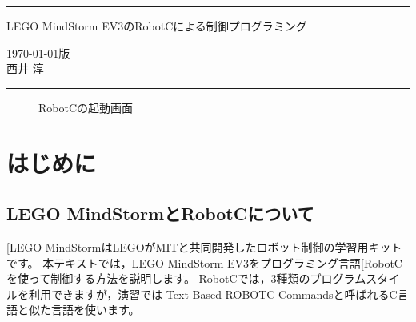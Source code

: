 \documentclass[11pt]{jsarticle}
\makeatletter
\def\nmindex{\@ifnextchar[{\@nmindex}{\@@nmindex}}
\def\@nmindex[#1]#2{#2\index{#1@#2}}
\def\@@nmindex#1{#1\index{#1}}
\makeatother
\begin{document}
\pagestyle{empty}
\vspace{-0.6cm}
\noindent
\rule{\linewidth}{0.5pt}
\begin{center}
{\Large LEGO MindStorm EV3のRobotCによる制御プログラミング}
\end{center}
\begin{flushright}
\today 版\\
西井 淳
\end{flushright}
\vspace{-0.6cm}
\rule{\linewidth}{0.5pt}

\vspace{-0.6cm}
{\small
  \setcounter{tocdepth}{3}
  \tableofcontents
}

\newpage
\pagestyle{fancy}


\begin{figure}\vspace{-.5cm}
  \caption{\label{fig:start}RobotCの起動画面}
\end{figure}
\section{はじめに}

\subsection{LEGO MindStormとRobotCについて}
\nmindex{LEGO MindStorm}はLEGOがMITと共同開発したロボット制御の学習用キットです。
本テキストでは，LEGO MindStorm EV3をプログラミング言語\nmindex{RobotC}
を使って制御する方法を説明します。
RobotCでは，3種類のプログラムスタイルを利用できますが，演習では
Text-Based ROBOTC Commandsと呼ばれるC言語と似た言語を使います。
\end{document}
